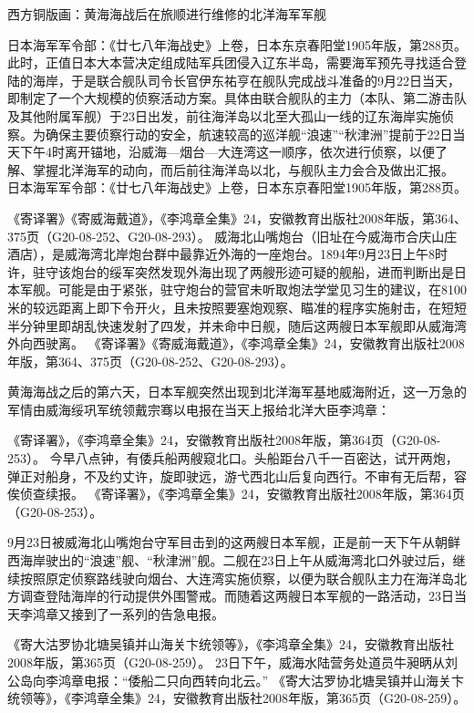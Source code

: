 \documentclass[12pt,UTF8]{ctexbook}
\begin{document}
西方铜版画：黄海海战后在旅顺进行维修的北洋海军军舰

日本海军军令部：《廿七八年海战史》上卷，日本东京春阳堂1905年版，第288页。
此时，正值日本大本营决定组成陆军兵团侵入辽东半岛，需要海军预先寻找适合登陆的海岸，于是联合舰队司令长官伊东祐亨在舰队完成战斗准备的9月22日当天，即制定了一个大规模的侦察活动方案。具体由联合舰队的主力（本队、第二游击队及其他附属军舰）于23日出发，前往海洋岛以北至大孤山一线的辽东海岸实施侦察。为确保主要侦察行动的安全，航速较高的巡洋舰“浪速”“秋津洲”提前于22日当天下午4时离开锚地，沿威海—烟台—大连湾这一顺序，依次进行侦察，以便了解、掌握北洋海军的动向，而后前往海洋岛以北，与舰队主力会合及做出汇报。 日本海军军令部：《廿七八年海战史》上卷，日本东京春阳堂1905年版，第288页。

《寄译署》《寄威海戴道》，《李鸿章全集》24，安徽教育出版社2008年版，第364、375页（G20-08-252、G20-08-293）。
威海北山嘴炮台（旧址在今威海市合庆山庄酒店），是威海湾北岸炮台群中最靠近外海的一座炮台。1894年9月23日上午8时许，驻守该炮台的绥军突然发现外海出现了两艘形迹可疑的舰船，进而判断出是日本军舰。可能是由于紧张，驻守炮台的营官未听取炮法学堂见习生的建议，在8100米的较远距离上即下令开火，且未按照要塞炮观察、瞄准的程序实施射击，在短短半分钟里即胡乱快速发射了四发，并未命中日舰，随后这两艘日本军舰即从威海湾外向西驶离。 《寄译署》《寄威海戴道》，《李鸿章全集》24，安徽教育出版社2008年版，第364、375页（G20-08-252、G20-08-293）。

黄海海战之后的第六天，日本军舰突然出现到北洋海军基地威海附近，这一万急的军情由威海绥巩军统领戴宗骞以电报在当天上报给北洋大臣李鸿章：

《寄译署》，《李鸿章全集》24，安徽教育出版社2008年版，第364页（G20-08-253）。
今早八点钟，有倭兵船两艘窥北口。头船距台八千一百密达，试开两炮，弹正对船身，不及约丈许，旋即驶远，游弋西北山后复向西行。不审有无后帮，容俟侦查续报。 《寄译署》，《李鸿章全集》24，安徽教育出版社2008年版，第364页（G20-08-253）。

9月23日被威海北山嘴炮台守军目击到的这两艘日本军舰，正是前一天下午从朝鲜西海岸驶出的“浪速”舰、“秋津洲”舰。二舰在23日上午从威海湾北口外驶过后，继续按照原定侦察路线驶向烟台、大连湾实施侦察，以便为联合舰队主力在海洋岛北方调查登陆海岸的行动提供外围警戒。而随着这两艘日本军舰的一路活动，23日当天李鸿章又接到了一系列的告急电报。

《寄大沽罗协北塘吴镇并山海关卞统领等》，《李鸿章全集》24，安徽教育出版社2008年版，第365页（G20-08-259）。
23日下午，威海水陆营务处道员牛昶昞从刘公岛向李鸿章电报：“倭船二只向西转向北云。” 《寄大沽罗协北塘吴镇并山海关卞统领等》，《李鸿章全集》24，安徽教育出版社2008年版，第365页（G20-08-259）。
\end{document}
